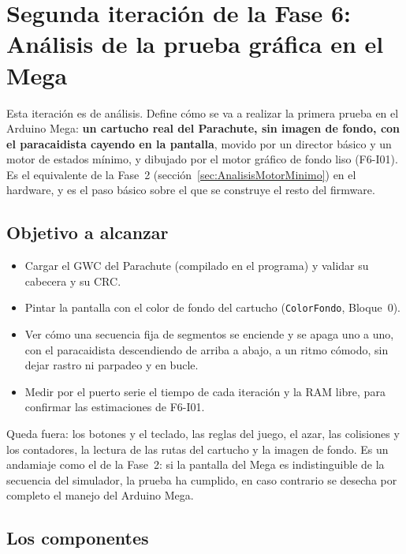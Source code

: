 \section{Segunda iteración de la Fase 6: Análisis de la prueba gráfica en el Mega}
\label{sec:F6I02}

Esta iteración es de análisis. Define cómo se va a realizar la primera prueba en el Arduino Mega: \textbf{un cartucho real del Parachute, sin imagen de fondo, con el paracaidista cayendo en la pantalla}, movido por un director básico y un motor de estados mínimo, y dibujado por el motor gráfico de fondo liso (F6-I01). Es el equivalente de la Fase~2 (sección~\ref{sec:AnalisisMotorMinimo}) en el hardware, y es el paso básico sobre el que se construye el resto del firmware.

\subsection{Objetivo a alcanzar}
\label{sec:F6I02Objetivo}

\begin{itemize}
	\item Cargar el GWC del Parachute (compilado en el programa) y validar su cabecera y su CRC.
	\item Pintar la pantalla con el color de fondo del cartucho (\texttt{ColorFondo}, Bloque~0).
	\item Ver cómo una secuencia fija de segmentos se enciende y se apaga uno a uno, con el paracaidista descendiendo de arriba a abajo, a un ritmo cómodo, sin dejar rastro ni parpadeo y en bucle.
	\item Medir por el puerto serie el tiempo de cada iteración y la RAM libre, para confirmar las estimaciones de F6-I01.
\end{itemize}

Queda fuera: los botones y el teclado, las reglas del juego, el azar, las colisiones y los contadores, la lectura de las rutas del cartucho y la imagen de fondo. Es un andamiaje como el de la Fase~2: si la pantalla del Mega es indistinguible de la secuencia del simulador, la prueba ha cumplido, en caso contrario se desecha por completo el manejo del Arduino Mega.

\subsection{Los componentes}
\label{sec:F6I02Componentes}

